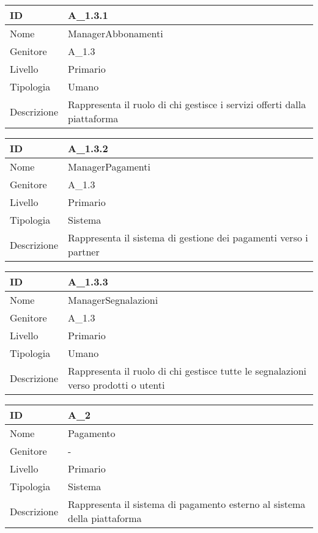 \begin{center}
\begin{tabular}{ |p{2cm}|p{10cm}|  }
\hline
ID & A\_1.3.1 \\\hline
Nome & ManagerAbbonamenti\\\hline
Genitore & A\_1.3\\\hline
Livello &  Primario \\\hline
Tipologia & Umano \\\hline
Descrizione &  Rappresenta il ruolo di chi gestisce i servizi offerti dalla piattaforma \\\hline
\end{tabular}
\label{table_attore:1.3.1}\newline

\begin{tabular}{ |p{2cm}|p{10cm}|  }
\hline
ID & A\_1.3.2 \\\hline
Nome & ManagerPagamenti\\\hline
Genitore & A\_1.3\\\hline
Livello &  Primario \\\hline
Tipologia & Sistema \\\hline
Descrizione &  Rappresenta il sistema di gestione dei pagamenti verso i partner \\\hline
\end{tabular}
\label{table_attore:1.3.1}\newline

\begin{tabular}{ |p{2cm}|p{10cm}|  }
\hline
ID & A\_1.3.3 \\\hline
Nome & ManagerSegnalazioni\\\hline
Genitore & A\_1.3\\\hline
Livello &  Primario \\\hline
Tipologia & Umano \\\hline
Descrizione &  Rappresenta il ruolo di chi gestisce tutte le segnalazioni verso prodotti o utenti \\\hline
\end{tabular}
\label{table_attore:1.3.1}\newline

\begin{tabular}{ |p{2cm}|p{10cm}|  }
\hline
ID & A\_2 \\\hline
Nome & Pagamento\\\hline
Genitore & - \\\hline
Livello &  Primario \\\hline
Tipologia & Sistema \\\hline
Descrizione &  Rappresenta il sistema di pagamento esterno al sistema della piattaforma \\\hline
\end{tabular}
\label{table_attore:2}\newline


\end{center}
